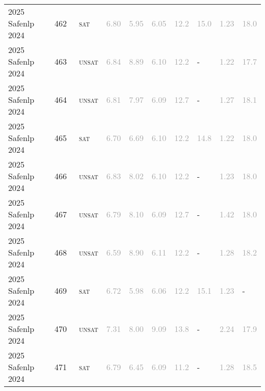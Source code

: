\begin{center}
{\begin{longtable}{@{}llllllllll@{}}
2025 Safenlp 2024 & 462 & ~\textsc{sat} & \textcolor{darkgray}{6.80} & \textcolor{darkgray}{5.95} & \textcolor{darkgray}{6.05} & \textcolor{darkgray}{12.2} & \textcolor{darkgray}{15.0} & \textcolor{darkgray}{1.23} & \textcolor{darkgray}{18.0} \\
2025 Safenlp 2024 & 463 & ~\textsc{unsat} & \textcolor{darkgray}{6.84} & \textcolor{darkgray}{8.89} & \textcolor{darkgray}{6.10} & \textcolor{darkgray}{12.2} & - & \textcolor{darkgray}{1.22} & \textcolor{darkgray}{17.7} \\
2025 Safenlp 2024 & 464 & ~\textsc{unsat} & \textcolor{darkgray}{6.81} & \textcolor{darkgray}{7.97} & \textcolor{darkgray}{6.09} & \textcolor{darkgray}{12.7} & - & \textcolor{darkgray}{1.27} & \textcolor{darkgray}{18.1} \\
2025 Safenlp 2024 & 465 & ~\textsc{sat} & \textcolor{darkgray}{6.70} & \textcolor{darkgray}{6.69} & \textcolor{darkgray}{6.10} & \textcolor{darkgray}{12.2} & \textcolor{darkgray}{14.8} & \textcolor{darkgray}{1.22} & \textcolor{darkgray}{18.0} \\
2025 Safenlp 2024 & 466 & ~\textsc{unsat} & \textcolor{darkgray}{6.83} & \textcolor{darkgray}{8.02} & \textcolor{darkgray}{6.10} & \textcolor{darkgray}{12.2} & - & \textcolor{darkgray}{1.23} & \textcolor{darkgray}{18.0} \\
2025 Safenlp 2024 & 467 & ~\textsc{unsat} & \textcolor{darkgray}{6.79} & \textcolor{darkgray}{8.10} & \textcolor{darkgray}{6.09} & \textcolor{darkgray}{12.7} & - & \textcolor{darkgray}{1.42} & \textcolor{darkgray}{18.0} \\
2025 Safenlp 2024 & 468 & ~\textsc{unsat} & \textcolor{darkgray}{6.59} & \textcolor{darkgray}{8.90} & \textcolor{darkgray}{6.11} & \textcolor{darkgray}{12.2} & - & \textcolor{darkgray}{1.28} & \textcolor{darkgray}{18.2} \\
2025 Safenlp 2024 & 469 & ~\textsc{sat} & \textcolor{darkgray}{6.72} & \textcolor{darkgray}{5.98} & \textcolor{darkgray}{6.06} & \textcolor{darkgray}{12.2} & \textcolor{darkgray}{15.1} & \textcolor{darkgray}{1.23} & - \\
2025 Safenlp 2024 & 470 & ~\textsc{unsat} & \textcolor{darkgray}{7.31} & \textcolor{darkgray}{8.00} & \textcolor{darkgray}{9.09} & \textcolor{darkgray}{13.8} & - & \textcolor{darkgray}{2.24} & \textcolor{darkgray}{17.9} \\
2025 Safenlp 2024 & 471 & ~\textsc{sat} & \textcolor{darkgray}{6.79} & \textcolor{darkgray}{6.45} & \textcolor{darkgray}{6.09} & \textcolor{darkgray}{11.2} & - & \textcolor{darkgray}{1.28} & \textcolor{darkgray}{18.5} \\

\end{longtable}}
\end{center}
